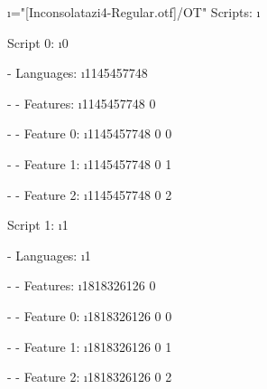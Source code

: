 \font\i="[Inconsolatazi4-Regular.otf]/OT"
Scripts: \the\XeTeXOTcountscripts \i

Script 0: \the\XeTeXOTscripttag \i 0

- Languages: \the\XeTeXOTcountlanguages \i 1145457748

- - Features: \the\XeTeXOTcountfeatures \i 1145457748 0

- - Feature 0: \the\XeTeXOTfeaturetag \i 1145457748 0 0

- - Feature 1: \the\XeTeXOTfeaturetag \i 1145457748 0 1

- - Feature 2: \the\XeTeXOTfeaturetag \i 1145457748 0 2

Script 1: \the\XeTeXOTscripttag \i 1

- Languages: \the\XeTeXOTcountlanguages \i 1

- - Features: \the\XeTeXOTcountfeatures \i 1818326126 0

- - Feature 0: \the\XeTeXOTfeaturetag \i 1818326126 0 0

- - Feature 1: \the\XeTeXOTfeaturetag \i 1818326126 0 1

- - Feature 2: \the\XeTeXOTfeaturetag \i 1818326126 0 2

\bye
